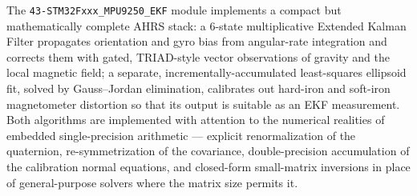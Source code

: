 \documentclass[11pt]{article}
\begin{document}
The \texttt{43-STM32Fxxx\_MPU9250\_EKF} module implements a compact but mathematically complete AHRS stack: a $6$-state multiplicative Extended Kalman Filter propagates orientation and gyro bias from angular-rate integration and corrects them with gated, TRIAD-style vector observations of gravity and the local magnetic field; a separate, incrementally-accumulated least-squares ellipsoid fit, solved by Gauss--Jordan elimination, calibrates out hard-iron and soft-iron magnetometer distortion so that its output is suitable as an EKF measurement. Both algorithms are implemented with attention to the numerical realities of embedded single-precision arithmetic --- explicit renormalization of the quaternion, re-symmetrization of the covariance, double-precision accumulation of the calibration normal equations, and closed-form small-matrix inversions in place of general-purpose solvers where the matrix size permits it.
\end{document}
